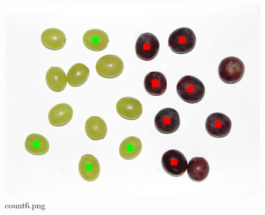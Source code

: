 \documentclass{classrep}
\begin{document}
\begin{figure}
\begin{minipage}{0.3\linewidth}
    \includegraphics[width=\textwidth]{gfx/count6_overlayed.png}
    \caption{count6.png}
    \label{fig:c6}
  \end{minipage}
\end{figure}
\end{document}
